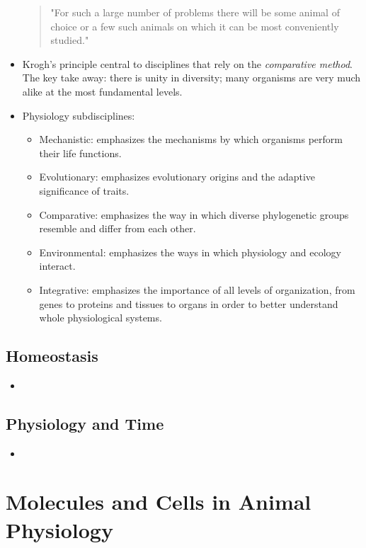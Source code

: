 \documentclass[12pt,a4paper]{article}
\begin{document}
\begin{itemize}
\begin{quote}
        "For such a large number of problems there will be some animal of choice or a few such animals on which it can be most conveniently studied."\end{quote}
    \item Krogh's principle central to disciplines that rely on the \textit{comparative method}. The key take away: there is unity in diversity; many organisms are very much alike at the most fundamental levels. 
    \item Physiology subdisciplines: 
        \begin{itemize}
            \item Mechanistic: emphasizes the mechanisms by which organisms perform their life functions.
            \item Evolutionary: emphasizes evolutionary origins and the adaptive significance of traits.
            \item Comparative: emphasizes the way in which diverse phylogenetic groups resemble and differ from each other.
            \item Environmental: emphasizes the ways in which physiology and ecology interact.
            \item Integrative: emphasizes the importance of all levels of organization, from genes to proteins and tissues to organs in order to better understand whole physiological systems.
        \end{itemize}
\end{itemize}

\subsection{Homeostasis}
\begin{itemize}
    \item 
\end{itemize}

\subsection{Physiology and Time}
\begin{itemize}
    \item 
\end{itemize}

\clearpage
\section{Molecules and Cells in Animal Physiology}
\end{document}
